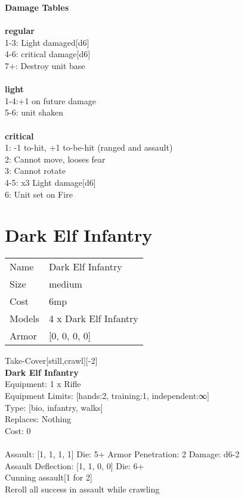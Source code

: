 {\bf Damage Tables} \\
\ \\ {\bf regular } \\
1-3: Light damaged[d6] \\
4-6: critical damage[d6] \\
7+: Destroy unit base \\
\ \\ {\bf light } \\
1-4:+1 on future damage \\
5-6: unit shaken \\
\ \\ {\bf critical } \\
1: -1 to-hit, +1 to-be-hit (ranged and assault) \\
2: Cannot move, looses fear \\
3: Cannot rotate \\
4-5: x3 Light damage[d6] \\
6: Unit set on Fire \\










\pagebreak\pagebreak

\section{ Dark Elf Infantry }

\begin{tabular}{ll}
  Name & Dark Elf Infantry \\
  Size & medium\\
  Cost & 6mp\\
  Models & 4 x Dark Elf Infantry\\
  Armor & [0, 0, 0, 0]\\
\end{tabular}

\noindent Take-Cover[still,crawl][-2]\\ 


{\bf Dark Elf Infantry } \\
Equipment: 1 x Rifle \\
Equipment Limits: [hands:2, training:1, independent:∞] \\
Type: [bio, infantry, walks] \\
Replaces: Nothing \\
Cost: 0\\
\ \\
Assault: [1, 1, 1, 1] Die: 5+ Armor Penetration: 2 Damage: d6-2 \\
Assault Deflection: [1, 1, 0, 0] Die: 6+\\
\indent Cunning assault[1 for 2]\\ 
Reroll all success in assault while crawling\\ 
 
